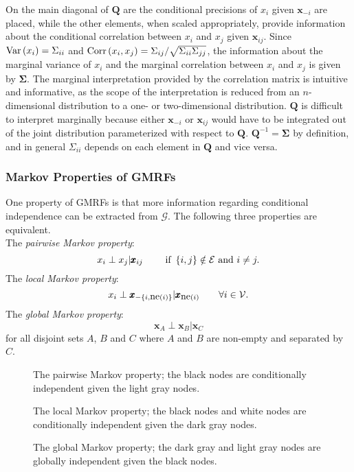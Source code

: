 \documentclass[12pt]{book}
\begin{document}
On the main diagonal of $\pmb{Q}$ are the conditional precisions of $x_i$ given $\pmb{x}_{-i}$ are placed, while the other elements, when scaled appropriately, provide information about the conditional correlation between $x_i$ and $x_j$ given $\pmb{x}_{ij}$. Since $\hbox{Var}\left(x_i\right)=\Sigma_{ii}$ and $\hbox{Corr}\left(x_i,x_j\right)=\Sigma_{ij}/\sqrt{\Sigma_{ii}\Sigma_{jj}}$, the information about the marginal variance of $x_i$ and the marginal correlation between $x_i$ and $x_j$ is given by $\pmb{\Sigma}$. The marginal interpretation provided by the correlation matrix is intuitive and informative, as the scope of the interpretation is reduced from an $n$-dimensional distribution to a one- or two-dimensional distribution. $\pmb{Q}$ is difficult to interpret marginally because either $\pmb{x}_{-i}$ or $\pmb{x}_{ij}$ would have to be integrated out of the joint distribution parameterized with respect to $\pmb{Q}$. $\pmb{Q}^{-1}=\pmb{\Sigma}$ by definition, and in general $\Sigma_{ii}$ depends on each element in $\pmb{Q}$ and vice versa.
\subsubsection{Markov Properties of GMRFs}
One property of GMRFs is that more information regarding conditional independence can be extracted from $\mathcal{G}$. The following three properties are equivalent. \\
The \textit{pairwise Markov property}:
\begin{equation*}
    x_i\perp x_j|\pmb{x}_{ij}\hspace{20pt}\hbox{ if }\left\lbrace i,j\right\rbrace\notin\mathcal{E}\hbox{ and }i\neq j.
\end{equation*}
The \textit{local Markov property}:
\begin{equation*}
    x_i\perp \pmb{x}_{-\left\lbrace i, \hbox{ne}\left(i\right)\right\rbrace}|\pmb{x}_{\hbox{ne}\left(i\right)}\hspace{20pt}\forall i\in\mathcal{V}.
\end{equation*}
The \textit{global Markov property}:
\begin{equation*}
    \pmb{x}_{A}\perp \pmb{x}_{B}|\pmb{x}_{C}
\end{equation*}
for all disjoint sets $A$, $B$ and $C$ where $A$ and $B$ are non-empty and separated by $C$. 
\begin{figure}
    \centering
    \caption{The pairwise Markov property; the black nodes are conditionally independent given the light gray nodes.}
    \label{fig:pairwise}
\end{figure}
\begin{figure}
    \centering
    \caption{The local Markov property; the black nodes and white nodes are conditionally independent given the dark gray nodes.}
    \label{fig:local}
\end{figure}
\begin{figure}
    \centering
    \caption{The global Markov property; the dark gray and light gray nodes are globally independent given the black nodes.}
    \label{fig:global}
\end{figure}
\end{document}
